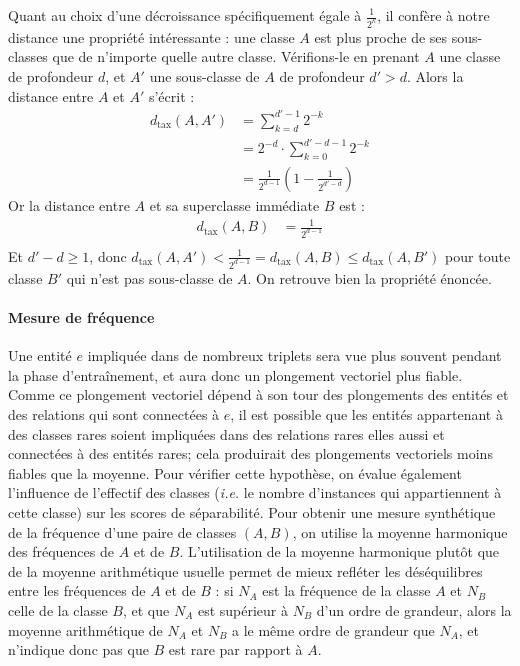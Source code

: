 Quant au choix d'une décroissance spécifiquement égale à $\frac{1}{2^k}$, il confère à notre distance une propriété intéressante : une classe $A$ est plus proche de ses sous-classes que de n'importe quelle autre classe. Vérifions-le en prenant $A$ une classe de profondeur $d$, et $A'$ une sous-classe de $A$ de profondeur $d' > d$. Alors la distance entre $A$ et $A'$ s'écrit :
\begin{align*}
    d_\text{tax}(A, A') &= \sum_{k = d}^{d'-1} 2^{-k} \\
    &= 2^{-d} \cdot \sum_{k=0}^{d'-d-1} 2^{-k} \\
    &= \frac{1}{2^{d-1}} \left(1 - \frac{1}{2^{d'-d}} \right) 
\end{align*}
Or la distance entre $A$ et sa superclasse immédiate $B$ est :
\begin{align*}
    d_\text{tax}(A, B) &= \frac{1}{2^{d-1}} \\
\end{align*}
Et $d'-d \geq 1$, donc $d_\text{tax}(A, A') < \frac{1}{2^{d-1}} = d_\text{tax}(A, B) \leq d_\text{tax}(A, B')$ pour toute classe $B'$ qui n'est pas sous-classe de $A$. On retrouve bien la propriété énoncée.



\paragraph{Mesure de fréquence}

Une entité $e$ impliquée dans de nombreux triplets sera vue plus souvent pendant la phase d'entraînement, et aura donc un plongement vectoriel plus fiable. Comme ce plongement vectoriel dépend à son tour des plongements des entités et des relations qui sont connectées à $e$, il est possible que les entités appartenant à des classes rares soient impliquées dans des relations rares elles aussi et connectées à des entités rares; cela produirait des plongements vectoriels moins fiables que la moyenne. Pour vérifier cette hypothèse, on évalue également l'influence de l'effectif des classes (\textit{i.e.} le nombre d'instances qui appartiennent à cette classe) sur les scores de séparabilité. Pour obtenir une mesure synthétique de la fréquence d'une paire de classes $(A, B)$, on utilise la moyenne harmonique des fréquences de $A$ et de $B$. L'utilisation de la moyenne harmonique plutôt que de la moyenne arithmétique usuelle permet de mieux refléter les déséquilibres entre les fréquences de $A$ et de $B$ : si $N_A$ est la fréquence de la classe $A$ et $N_B$ celle de la classe $B$, et que $N_A$ est supérieur à $N_B$ d'un ordre de grandeur, alors la moyenne arithmétique de $N_A$ et $N_B$ a le même ordre de grandeur que $N_A$, et n'indique donc pas que $B$ est rare par rapport à $A$.

